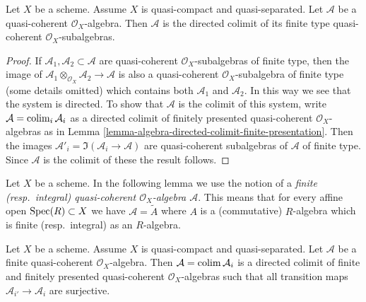 \begin{lemma}
\label{lemma-algebra-directed-colimit-finite-type}
Let $X$ be a scheme. Assume $X$ is quasi-compact and quasi-separated.
Let $\mathcal{A}$ be a quasi-coherent $\mathcal{O}_X$-algebra.
Then $\mathcal{A}$ is the directed colimit of its finite type
quasi-coherent $\mathcal{O}_X$-subalgebras.
\end{lemma}

\begin{proof}
If $\mathcal{A}_1, \mathcal{A}_2 \subset \mathcal{A}$ are
quasi-coherent $\mathcal{O}_X$-subalgebras of finite type, then the image of
$\mathcal{A}_1 \otimes_{\mathcal{O}_X} \mathcal{A}_2 \to \mathcal{A}$
is also a quasi-coherent $\mathcal{O}_X$-subalgebra of finite type
(some details omitted) which contains both $\mathcal{A}_1$ and $\mathcal{A}_2$.
In this way we see that the system is directed.
To show that $\mathcal{A}$ is the colimit of this system, write
$\mathcal{A} = \mathop{\mathrm{colim}}\nolimits_i \mathcal{A}_i$ as a directed
colimit of finitely presented quasi-coherent $\mathcal{O}_X$-algebras as in
Lemma \ref{lemma-algebra-directed-colimit-finite-presentation}.
Then the images $\mathcal{A}'_i = \Im(\mathcal{A}_i \to \mathcal{A})$ are
quasi-coherent subalgebras of $\mathcal{A}$ of finite type. Since
$\mathcal{A}$ is the colimit of these the result follows.
\end{proof}

\noindent
Let $X$ be a scheme. In the following lemma we use the notion
of a {\it finite (resp.\ integral) quasi-coherent
$\mathcal{O}_X$-algebra $\mathcal{A}$}. This means that for every
affine open $\mathop{\mathrm{Spec}}(R) \subset X$ we have
$\mathcal{A} = \widetilde{A}$ where $A$ is a (commutative) $R$-algebra
which is finite (resp.\ integral) as an $R$-algebra.

\begin{lemma}
\label{lemma-finite-algebra-directed-colimit-finite-finitely-presented}
Let $X$ be a scheme. Assume $X$ is quasi-compact and quasi-separated.
Let $\mathcal{A}$ be a finite quasi-coherent $\mathcal{O}_X$-algebra.
Then $\mathcal{A} = \mathop{\mathrm{colim}}\nolimits \mathcal{A}_i$ is a directed colimit of finite
and finitely presented quasi-coherent $\mathcal{O}_X$-algebras
such that all transition maps $\mathcal{A}_{i'} \to \mathcal{A}_i$
are surjective.
\end{lemma}

